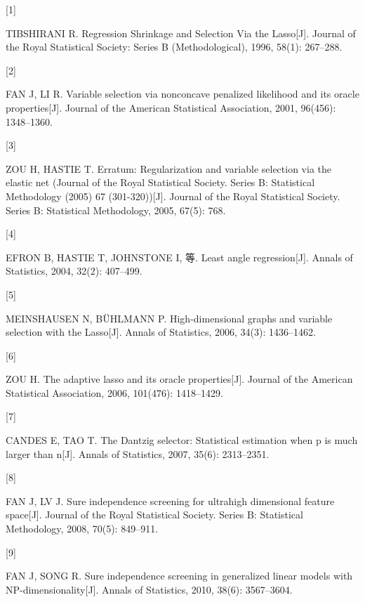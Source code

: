 \documentclass[
]{ctexart}
\newlength{\cslhangindent}
\newlength{\csllabelwidth}
\newenvironment{CSLReferences}[2] %
 {%
  \setlength{\parindent}{0pt}
  \ifodd #1 \everypar{\setlength{\hangindent}{\cslhangindent}}\ignorespaces\fi
  \ifnum #2 > 0
  \setlength{\parskip}{#2\baselineskip}
  \fi
 }%
 {}
\newcommand{\CSLLeftMargin}[1]{\parbox[t]{\csllabelwidth}{#1}}
\newcommand{\CSLRightInline}[1]{\parbox[t]{\linewidth - \csllabelwidth}{#1}\break}
\begin{document}
\hypertarget{refs}{}
\begin{CSLReferences}{0}{0}
\leavevmode{}%
\CSLLeftMargin{{[}1{]} }
\CSLRightInline{TIBSHIRANI R. {Regression Shrinkage and Selection Via
the Lasso}{[}J{]}. Journal of the Royal Statistical Society: Series B
(Methodological), 1996, 58(1): 267--288.}

\leavevmode{}%
\CSLLeftMargin{{[}2{]} }
\CSLRightInline{FAN J, LI R. {Variable selection via nonconcave
penalized likelihood and its oracle properties}{[}J{]}. Journal of the
American Statistical Association, 2001, 96(456): 1348--1360.}

\leavevmode{}%
\CSLLeftMargin{{[}3{]} }
\CSLRightInline{ZOU H, HASTIE T. {Erratum: Regularization and variable
selection via the elastic net (Journal of the Royal Statistical Society.
Series B: Statistical Methodology (2005) 67 (301-320))}{[}J{]}. Journal
of the Royal Statistical Society. Series B: Statistical Methodology,
2005, 67(5): 768.}

\leavevmode{}%
\CSLLeftMargin{{[}4{]} }
\CSLRightInline{EFRON B, HASTIE T, JOHNSTONE I, 等. Least angle
regression{[}J{]}. Annals of Statistics, 2004, 32(2): 407--499.}

\leavevmode{}%
\CSLLeftMargin{{[}5{]} }
\CSLRightInline{MEINSHAUSEN N, BÜHLMANN P. {High-dimensional graphs and
variable selection with the Lasso}{[}J{]}. Annals of Statistics, 2006,
34(3): 1436--1462.}

\leavevmode{}%
\CSLLeftMargin{{[}6{]} }
\CSLRightInline{ZOU H. {The adaptive lasso and its oracle
properties}{[}J{]}. Journal of the American Statistical Association,
2006, 101(476): 1418--1429.}

\leavevmode{}%
\CSLLeftMargin{{[}7{]} }
\CSLRightInline{CANDES E, TAO T. {The Dantzig selector: Statistical
estimation when p is much larger than n}{[}J{]}. Annals of Statistics,
2007, 35(6): 2313--2351.}

\leavevmode{}%
\CSLLeftMargin{{[}8{]} }
\CSLRightInline{FAN J, LV J. {Sure independence screening for ultrahigh
dimensional feature space}{[}J{]}. Journal of the Royal Statistical
Society. Series B: Statistical Methodology, 2008, 70(5): 849--911.}

\leavevmode{}%
\CSLLeftMargin{{[}9{]} }
\CSLRightInline{FAN J, SONG R. {Sure independence screening in
generalized linear models with NP-dimensionality}{[}J{]}. Annals of
Statistics, 2010, 38(6): 3567--3604.}


\end{CSLReferences}
\end{document}
